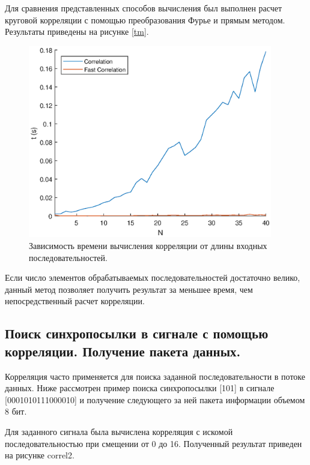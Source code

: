 \documentclass[a4paper,14pt]{extarticle}
\begin{document}
Для сравнения представленных способов вычисления был выполнен расчет круговой корреляции с помощью преобразования Фурье и прямым методом. Результаты приведены на рисунке \ref{tm}.
\begin{figure}[H]
\centering
\includegraphics[width=0.95\textwidth]{correl.eps}
\captionsetup{justification=centering,margin=1cm}
\caption{Зависимость времени вычисления корреляции от длины входных последовательностей.}
\label{correl}
\end{figure}
Если число элементов обрабатываемых последовательностей достаточно велико, данный метод позволяет получить результат за меньшее время, чем непосредственный расчет корреляции.

\subsection{Поиск синхропосылки в сигнале с помощью корреляции. Получение пакета данных.}

Корреляция часто применяется для поиска заданной последовательности в потоке данных. Ниже рассмотрен пример поиска синхропосылки 
[101] в сигнале [0001010111000010] и получение следующего за ней пакета информации объемом 8 бит.

Для заданного сигнала была вычислена корреляция с искомой последовательностью при смещении от 0 до 16. Полученный результат приведен на рисунке correl2.
\end{document}
